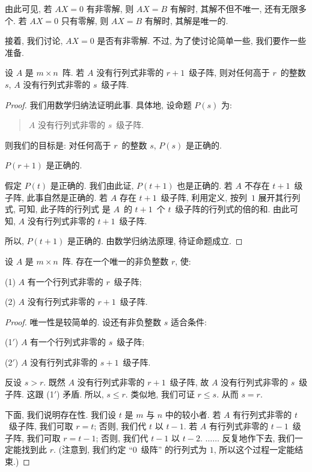 由此可见, 若 \(AX = 0\) 有非零解,
则 \(AX = B\) 有解时,
其解不但不唯一, 还有无限多个.
若 \(AX = 0\) 只有零解,
则 \(AX = B\) 有解时,
其解是唯一的.

接着, 我们讨论, \(AX = 0\) 是否有非零解.
不过, 为了使讨论简单一些, 我们要作一些准备.

\begin{theorem}
    设 \(A\) 是 \(m \times n\)~阵.
    若 \(A\) 没有行列式非零的 \(r+1\)~级子阵,
    则对任何高于 \(r\)~的整数 \(s\),
    \(A\) 没有行列式非零的 \(s\)~级子阵.
\end{theorem}

\begin{proof}
    我们用数学归纳法证明此事.
    具体地, 设命题 \(P(s)\) 为:
    \begin{quotation}
        \(A\) 没有行列式非零的 \(s\)~级子阵.
    \end{quotation}
    则我们的目标是:
    对任何高于 \(r\)~的整数 \(s\),
    \(P(s)\) 是正确的.

    \(P(r+1)\) 是正确的.

    假定 \(P(t)\) 是正确的.
    我们由此证, \(P(t+1)\) 也是正确的.
    若 \(A\) 不存在 \(t+1\)~级子阵,
    此事自然是正确的.
    若 \(A\) 存在 \(t+1\)~级子阵,
    利用定义, 按列~\(1\) 展开其行列式,
    可知,
    此子阵的行列式%
    是 \(A\)~的 \(t+1\)~个 \(t\)~级子阵的行列式的倍的和.
    由此可知,
    \(A\) 没有行列式非零的 \(t+1\)~级子阵.

    所以, \(P(t+1)\) 是正确的.
    由数学归纳法原理, 待证命题成立.
\end{proof}

\begin{theorem}
    设 \(A\) 是 \(m \times n\)~阵.
    存在一个唯一的非负整数 \(r\),
    使:

    (1)
    \(A\) 有一个行列式非零的 \(r\)~级子阵;

    (2)
    \(A\) 没有行列式非零的 \(r+1\)~级子阵.
\end{theorem}

\begin{proof}
    唯一性是较简单的.
    设还有非负整数 \(s\) 适合条件:

    (1\ensuremath{'})
    \(A\) 有一个行列式非零的 \(s\)~级子阵;

    (2\ensuremath{'})
    \(A\) 没有行列式非零的 \(s+1\)~级子阵.

    反设 \(s > r\).
    既然 \(A\) 没有行列式非零的 \(r+1\)~级子阵,
    故 \(A\) 没有行列式非零的 \(s\)~级子阵.
    这跟 (1\ensuremath{'}) 矛盾.
    所以, \(s \leq r\).
    类似地, 我们可证 \(r \leq s\).
    从而 \(s = r\).

    下面, 我们说明存在性.
    我们设 \(t\) 是 \(m\) 与 \(n\) 中的较小者.
    若 \(A\) 有行列式非零的 \(t\)~级子阵,
    我们可取 \(r = t\);
    否则, 我们代 \(t\) 以 \(t - 1\).
    若 \(A\) 有行列式非零的 \(t - 1\)~级子阵,
    我们可取 \(r = t - 1\);
    否则, 我们代 \(t - 1\) 以 \(t - 2\).
    \(\dots \dots\)
    反复地作下去,
    我们一定能找到此 \(r\).
    (注意到, 我们约定 ``\(0\)~级阵'' 的行列式为 \(1\),
    所以这个过程一定能结束.)
\end{proof}

